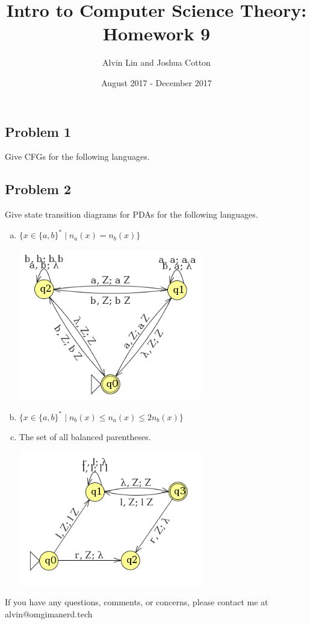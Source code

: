 \documentclass{math}
\title{Intro to Computer Science Theory: Homework 9}
\author{Alvin Lin and Joshua Cotton}
\date{August 2017 - December 2017}
\begin{document}
\maketitle

\subsection*{Problem 1}
Give CFGs for the following languages.

\subsection*{Problem 2}
Give state transition diagrams for PDAs for the following languages.
\begin{enumerate}[(a)]
  \item \( \{x\in\{a,b\}^*\mid n_a(x) = n_b(x)\} \)
  \begin{center}
    \includegraphics[width=8cm]{assets/hw_9_2a.png}
  \end{center}
  \item \( \{x\in\{a,b\}^*\mid n_b(x)\le n_a(x)\le 2n_b(x)\} \)
  \item The set of all balanced parentheses.
  \begin{center}
    \includegraphics[width=8cm]{assets/hw_9_2c.png}
  \end{center}
\end{enumerate}

\begin{center}
  If you have any questions, comments, or concerns, please contact me at
  alvin@omgimanerd.tech
\end{center}
\end{document}
